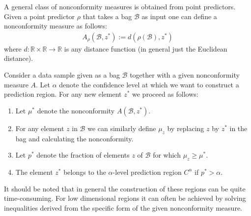     \begin{example}
        A general class of nonconformity measures is obtained from point predictors. Given a point predictor $\rho$ that takes a bag $\mathcal{B}$ as input one can define a nonconformity measure as follows:
        \begin{gather}
            A_\rho(\mathcal{B}, z^*) := d(\rho(\mathcal{B}), z^*)
        \end{gather}
        where $d:\mathbb{R}\times\mathbb{R}\rightarrow\mathbb{R}$ is any distance function (in general just the Euclidean distance).
    \end{example}

    \begin{construct}
        Consider a data sample given as a bag $\mathcal{B}$ together with a given nonconformity measure $A$. Let $\alpha$ denote the confidence level at which we want to construct a prediction region. For any new element $z^*$ we proceed as follows:
        \begin{enumerate}
            \item Let $\mu^*$ denote the nonconformity $A(\mathcal{B}, z^*)$.
            \item For any element $z$ in $\mathcal{B}$ we can similarly define $\mu_z$ by replacing $z$ by $z^*$ in the bag and calculating the nonconformity.
            \item Let $p^*$ denote the fraction of elements $z$ of $\mathcal{B}$ for which $\mu_z\geq\mu^*$.
            \item The element $z^*$ belongs to the $\alpha$-level prediction region $C^\alpha$ if $p^*>\alpha$.
        \end{enumerate}
        It should be noted that in general the construction of these regions can be quite time-consuming. For low dimensional regions it can often be achieved by solving inequalities derived from the specific form of the given nonconformity measure.
    \end{construct}


